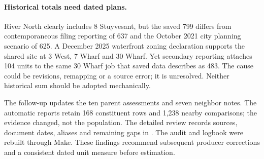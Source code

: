 \paragraph{Historical totals need dated plans.} River North clearly includes 8 Stuyvesant, but the saved 799 differs from contemporaneous filing reporting of 637 and the October 2021 city planning scenario of 625. A December 2025 waterfront zoning declaration supports the shared site at 3 West, 7 Wharf and 30 Wharf. Yet secondary reporting attaches 104 units to the same 30 Wharf job that saved data describes as 483. The cause could be revisions, remapping or a source error; it is unresolved. Neither historical sum should be adopted mechanically.

The follow-up updates the ten parent assessments and seven neighbor notes. The automatic reports retain 168 constituent rows and 1,238 nearby comparisons; the evidence changed, not the population. The detailed review records sources, document dates, aliases and remaining gaps in
.
The audit and logbook were rebuilt through Make. These findings recommend subsequent producer corrections and a consistent dated unit measure before estimation.

